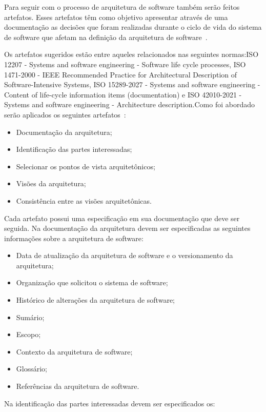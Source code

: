 Para seguir com o processo de arquitetura de software também serão feitos artefatos. Esses artefatos têm como objetivo apresentar através de uma documentação as decisões que foram realizadas durante o ciclo de vida do sistema de software que afetam na definição da arquitetura de software~\cite{ISO_1471}.

Os artefatos sugeridos estão entre aqueles relacionados nas seguintes normas:ISO 12207 - Systems and software engineering - Software life cycle processes, ISO 1471-2000 - IEEE Recommended Practice for Architectural Description of Software-Intensive Systems, ISO 15289-2027 - Systems and software engineering - Content of life-cycle information items (documentation) e ISO 42010-2021 - Systems and software engineering - Architecture description.Como foi abordado serão aplicados os seguintes artefatos~\cite{ISO_1471}:

\begin{itemize}
    \item Documentação da arquitetura;
    \item Identificação das partes interessadas;
    \item Selecionar os pontos de vista arquitetônicos;
    \item Visões da arquitetura;
    \item Consistência entre as visões arquitetônicas.
\end{itemize}

Cada artefato possui uma especificação em sua documentação que deve ser seguida. Na documentação da arquitetura devem ser especificadas as seguintes informações sobre a arquitetura de software\cite{ISO_1471}:

\begin{itemize}
    \item Data de atualização da arquitetura de software e o versionamento da arquitetura;
    \item Organização que solicitou o sistema de software;
    \item Histórico de alterações da arquitetura de software;
    \item Sumário;
    \item Escopo;
    \item Contexto da arquitetura de software;
    \item Glossário;
    \item Referências da arquitetura de software.
\end{itemize}

Na identificação das partes interessadas devem ser especificados os\cite{ISO_1471}:

